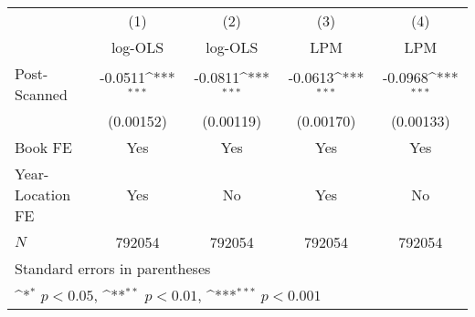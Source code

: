 {
\def\sym#1{\ifmmode^{#1}\else\(^{#1}\)\fi}
\begin{tabular}{l*{4}{c}}
\hline\hline
            &\multicolumn{1}{c}{(1)}&\multicolumn{1}{c}{(2)}&\multicolumn{1}{c}{(3)}&\multicolumn{1}{c}{(4)}\\
            &\multicolumn{1}{c}{log-OLS}&\multicolumn{1}{c}{log-OLS}&\multicolumn{1}{c}{LPM}&\multicolumn{1}{c}{LPM}\\
\hline
Post-Scanned&     -0.0511\sym{***}&     -0.0811\sym{***}&     -0.0613\sym{***}&     -0.0968\sym{***}\\
            &   (0.00152)         &   (0.00119)         &   (0.00170)         &   (0.00133)         \\
\hline
Book FE     &         Yes         &         Yes         &         Yes         &         Yes         \\
Year-Location FE&         Yes         &          No         &         Yes         &          No         \\
\(N\)       &      792054         &      792054         &      792054         &      792054         \\
\hline\hline
\multicolumn{5}{l}{\footnotesize Standard errors in parentheses}\\
\multicolumn{5}{l}{\footnotesize \sym{*} \(p<0.05\), \sym{**} \(p<0.01\), \sym{***} \(p<0.001\)}\\
\end{tabular}
}
